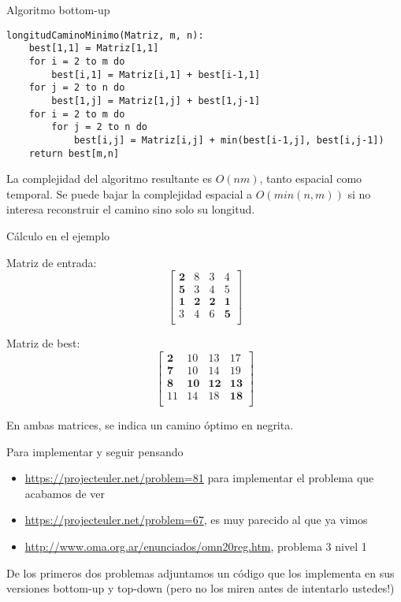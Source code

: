 \documentclass[compress]{beamer}
\begin{document}
\begin{frame}[fragile]{Algoritmo bottom-up}
\begin{lstlisting}
longitudCaminoMinimo(Matriz, m, n):
    best[1,1] = Matriz[1,1]
    for i = 2 to m do
        best[i,1] = Matriz[i,1] + best[i-1,1]
    for j = 2 to n do
        best[1,j] = Matriz[1,j] + best[1,j-1]
    for i = 2 to m do
        for j = 2 to n do
            best[i,j] = Matriz[i,j] + min(best[i-1,j], best[i,j-1])
    return best[m,n]

\end{lstlisting}

La complejidad del algoritmo resultante es $O(nm)$, tanto espacial como temporal. Se puede bajar la complejidad espacial a $O(min(n,m))$ si no interesa reconstruir el camino sino solo su longitud.
\end{frame}

\begin{frame}{Cálculo en el ejemplo}

Matriz de entrada:
                \[ \left [  \begin{array}{cccc}
\textbf{2} & 8 & 3 & 4 \\
\textbf{5} & 3 & 4 & 5 \\
\textbf{1} & \textbf{2} & \textbf{2} & \textbf{1} \\
3 & 4 & 6 & \textbf{5} \\
 \end{array} \right ] \]

Matriz de best:
                \[ \left [  \begin{array}{cccc}
\textbf{2} & 10 & 13 & 17 \\
\textbf{7} & 10 & 14 & 19 \\
\textbf{8} & \textbf{10} & \textbf{12} & \textbf{13} \\
11 & 14 & 18 & \textbf{18} \\
 \end{array} \right ] \]

En ambas matrices, se indica un camino óptimo en negrita.

\end{frame}

\begin{frame}{Para implementar y seguir pensando}
\begin{itemize}
\item {\small \url{https://projecteuler.net/problem=81}} para implementar el problema que acabamos de ver
\item {\small \url{https://projecteuler.net/problem=67}}, es muy parecido al que ya vimos
\item {\small \url{http://www.oma.org.ar/enunciados/omn20reg.htm}}, problema 3 nivel 1
\end{itemize}
\bigskip
De los primeros dos problemas adjuntamos un c\'odigo que los implementa en sus versiones bottom-up y top-down (pero no los miren antes de intentarlo ustedes!)
\end{frame}
\end{document}
